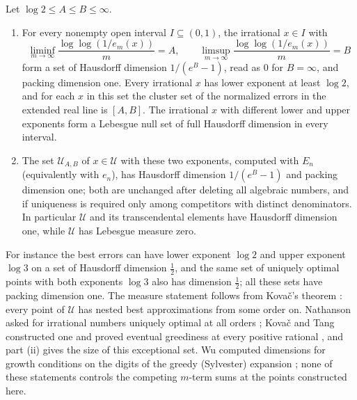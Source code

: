 \begin{theorem}\label{lih:thm:egypt}
Let $\log2\le A\le B\le\infty$.
\begin{enumerate}[label=\textup{(\roman*)}]
\item For every nonempty open interval $I\subseteq(0,1)$, the irrational $x\in I$ with
\[
 \liminf_{m\to\infty}\frac{\log\log(1/e_m(x))}m=A,\qquad\limsup_{m\to\infty}\frac{\log\log(1/e_m(x))}m=B
\]
form a set of Hausdorff dimension $1/(e^B-1)$, read as $0$ for $B=\infty$, and packing dimension one. Every
irrational $x$ has lower exponent at least $\log2$, and for each $x$ in this set the cluster set of the
normalized errors in the extended real line is $[A,B]$. The irrational $x$ with different lower and upper
exponents form a Lebesgue null set of full Hausdorff dimension in every interval.
\item The set $\mathcal U_{A,B}$ of $x\in\mathcal U$ with these two exponents, computed with $E_n$ (equivalently with
$e_n$), has Hausdorff dimension $1/(e^B-1)$ and packing dimension one; both are unchanged after deleting
all algebraic numbers, and if uniqueness is required only among competitors with distinct denominators.
In particular $\mathcal U$ and its transcendental elements have Hausdorff dimension one, while $\mathcal U$ has
Lebesgue measure zero.
\end{enumerate}
\end{theorem}

For instance the best errors can have lower exponent $\log2$ and upper exponent $\log3$ on a set of
Hausdorff dimension $\frac12$, and the same set of uniquely optimal points with both exponents $\log3$ also has
dimension $\frac12$; all these sets have packing dimension one. The measure statement follows from
Kova\v{c}'s theorem \cite{Kovac2025Eventually}: every point of $\mathcal U$ has nested best approximations from
some order on. Nathanson asked for irrational numbers uniquely optimal at all orders
\cite{Nathanson2023Underapproximation}; Kova\v{c} and Tang constructed one and proved eventual greediness
at every positive rational \cite{KovacTang2026Eventually}, and part (ii) gives the size of this
exceptional set. Wu computed dimensions for growth conditions on the digits of the greedy (Sylvester)
expansion \cite{Wu2003Distribution}; none of these statements controls the competing $m$-term sums at
the points constructed here.

